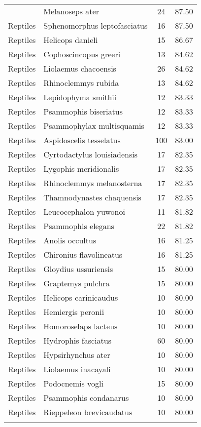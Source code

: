 \begin{longtable}{llcc}
{  Reptiles & Melanoseps ater &  24 & 87.50 \\ 
  Reptiles & Sphenomorphus leptofasciatus &  16 & 87.50 \\ 
  Reptiles & Helicops danieli &  15 & 86.67 \\ 
  Reptiles & Cophoscincopus greeri &  13 & 84.62 \\ 
  Reptiles & Liolaemus chacoensis &  26 & 84.62 \\ 
  Reptiles & Rhinoclemmys rubida &  13 & 84.62 \\ 
  Reptiles & Lepidophyma smithii &  12 & 83.33 \\ 
  Reptiles & Psammophis biseriatus &  12 & 83.33 \\ 
  Reptiles & Psammophylax multisquamis &  12 & 83.33 \\ 
  Reptiles & Aspidoscelis tesselatus & 100 & 83.00 \\ 
  Reptiles & Cyrtodactylus louisiadensis &  17 & 82.35 \\ 
  Reptiles & Lygophis meridionalis &  17 & 82.35 \\ 
  Reptiles & Rhinoclemmys melanosterna &  17 & 82.35 \\ 
  Reptiles & Thamnodynastes chaquensis &  17 & 82.35 \\ 
  Reptiles & Leucocephalon yuwonoi &  11 & 81.82 \\ 
  Reptiles & Psammophis elegans &  22 & 81.82 \\ 
  Reptiles & Anolis occultus &  16 & 81.25 \\ 
  Reptiles & Chironius flavolineatus &  16 & 81.25 \\ 
  Reptiles & Gloydius ussuriensis &  15 & 80.00 \\ 
  Reptiles & Graptemys pulchra &  15 & 80.00 \\ 
  Reptiles & Helicops carinicaudus &  10 & 80.00 \\ 
  Reptiles & Hemiergis peronii &  10 & 80.00 \\ 
  Reptiles & Homoroselaps lacteus &  10 & 80.00 \\ 
  Reptiles & Hydrophis fasciatus &  60 & 80.00 \\ 
  Reptiles & Hypsirhynchus ater &  10 & 80.00 \\ 
  Reptiles & Liolaemus inacayali &  10 & 80.00 \\ 
  Reptiles & Podocnemis vogli &  15 & 80.00 \\ 
  Reptiles & Psammophis condanarus &  10 & 80.00 \\ 
  Reptiles & Rieppeleon brevicaudatus &  10 & 80.00 \\ 
}
\end{longtable}
